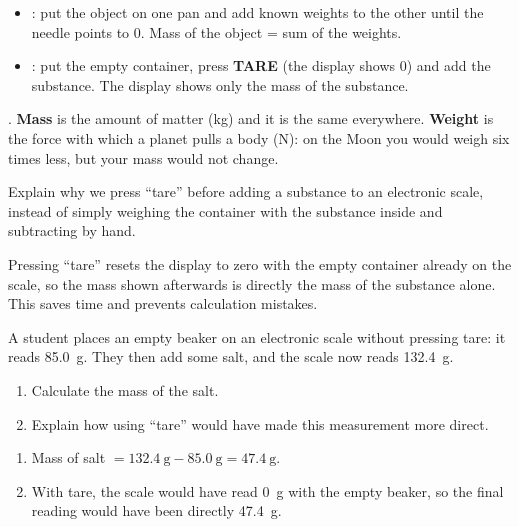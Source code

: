 \begin{itemize}
    \item {}: put the object on one pan and add known weights to the other until the needle points to 0. Mass of the object = sum of the weights.
    \item {}: put the empty container, press \textbf{TARE} (the display shows 0) and add the substance. The display shows only the mass of the substance.
\end{itemize}

\begin{impt}
    . \textbf{Mass} is the amount of matter (\unit{\kg}) and it is the same everywhere. \textbf{Weight} is the force with which a planet pulls a body (\unit{\N}): on the Moon you would weigh six times less, but your mass would not change.
\end{impt}

\begin{exercise}
    Explain why we press ``tare'' before adding a substance to an electronic scale, instead of simply weighing the container with the substance inside and subtracting by hand.
    \begin{solu}
        Pressing ``tare'' resets the display to zero with the empty container already on the scale, so the mass shown afterwards is directly the mass of the substance alone. This saves time and prevents calculation mistakes.
    \end{solu}
\end{exercise}

\begin{exercise}
    A student places an empty beaker on an electronic scale without pressing tare: it reads \qty{85.0}{\g}. They then add some salt, and the scale now reads \qty{132.4}{\g}.
    \begin{enumerate}[label=\letraminuscula]
        \item Calculate the mass of the salt.
        \item Explain how using ``tare'' would have made this measurement more direct.
    \end{enumerate}
    \begin{solu}
        \begin{enumerate}[label=\alph*)]
            \item Mass of salt \(= \qty{132.4}{\g} - \qty{85.0}{\g} = \qty{47.4}{\g}\).
            \item With tare, the scale would have read \qty{0}{\g} with the empty beaker, so the final reading would have been directly \qty{47.4}{\g}.
        \end{enumerate}
    \end{solu}
\end{exercise}

